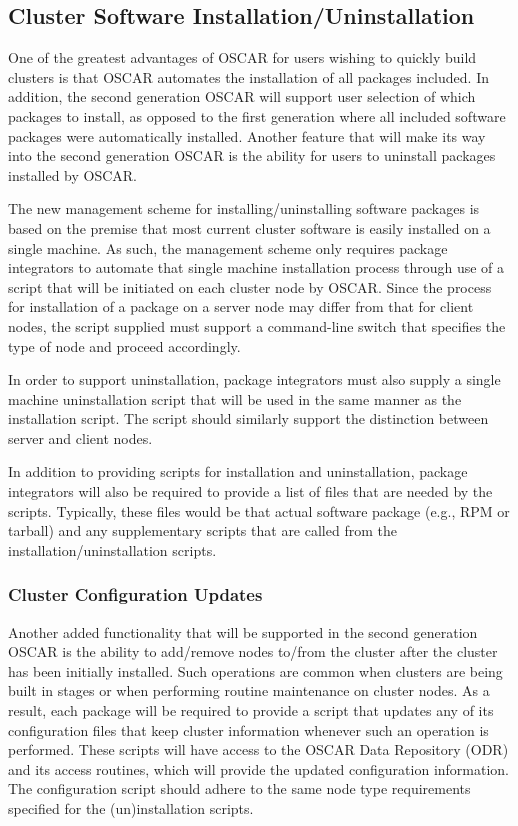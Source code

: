 \subsection{Cluster Software Installation/Uninstallation}

One of the greatest advantages of OSCAR for users wishing to quickly
build clusters is that OSCAR automates the installation of all
packages included. In addition, the second generation OSCAR will
support user selection of which packages to install, as opposed to the
first generation where all included software packages were
automatically installed. Another feature that will make its way into
the second generation OSCAR is the ability for users to uninstall
packages installed by OSCAR.

The new management scheme for installing/uninstalling software
packages is based on the premise that most current cluster software is
easily installed on a single machine. As such, the management scheme
only requires package integrators to automate that single machine
installation process through use of a script that will be initiated on
each cluster node by OSCAR. Since the process for installation of a
package on a server node may differ from that for client nodes, the
script supplied must support a command-line switch that specifies the
type of node and proceed accordingly.

In order to support uninstallation, package integrators must also
supply a single machine uninstallation script that will be used in the
same manner as the installation script. The script should similarly
support the distinction between server and client nodes.

In addition to providing scripts for installation and uninstallation,
package integrators will also be required to provide a list of files
that are needed by the scripts.  Typically, these files would be that
actual software package (e.g., RPM or tarball) and any supplementary
scripts that are called from the installation/uninstallation scripts.

\subsubsection{Cluster Configuration Updates}

Another added functionality that will be supported in the second
generation OSCAR is the ability to add/remove nodes to/from the
cluster after the cluster has been initially installed. Such
operations are common when clusters are being built in stages or when
performing routine maintenance on cluster nodes. As a result, each
package will be required to provide a script that updates any of its
configuration files that keep cluster information whenever such an
operation is performed. These scripts will have access to the OSCAR
Data Repository (ODR) and its access routines, which will provide the
updated configuration information. The configuration script should
adhere to the same node type requirements specified for the
(un)installation scripts.

